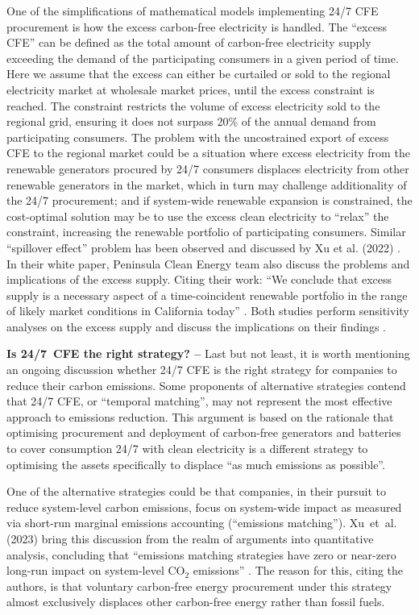 One of the simplifications of mathematical models implementing 24/7 CFE procurement is how the excess carbon-free electricity is handled. 
The \enquote{excess CFE} can be defined as the total amount of carbon-free electricity supply exceeding the demand of the participating consumers in a given period of time.
Here we assume that the excess can either be curtailed or sold to the regional electricity market at wholesale market prices, until the excess constraint is reached. 
The constraint restricts the volume of excess electricity sold to the regional grid, ensuring it does not surpass 20\% of the annual demand from participating consumers.
The problem with the uncostrained export of excess CFE to the regional market could be a situation where excess electricity from the renewable generators procured by 24/7 consumers displaces electricity from other renewable generators in the market, which in turn may challenge additionality of the 24/7 procurement; and if system-wide renewable expansion is constrained, the cost-optimal solution may be to use the excess clean electricity to \enquote{relax} the constraint, increasing the renewable portfolio of participating consumers.
Similar \enquote{spillover effect} problem has been observed and discussed by Xu et al. (2022) \cite{xu-247CFE-SSRN}.
In their white paper, Peninsula Clean Energy team also discuss the problems and implications of the excess supply. Citing their work: \enquote{We conclude that excess supply is a necessary aspect of a time-coincident renewable portfolio in the range of likely market conditions in California today} \cite{peninsula-report247}.
Both studies perform sensitivity analyses on the excess supply and discuss the implications on their findings \cite{xu-247CFE-SSRN, peninsula-report247}.

\textbf{Is 24/7~CFE the right strategy? --} Last but not least, it is worth mentioning an ongoing discussion whether 24/7 CFE is the right strategy for companies to reduce their carbon emissions.
Some proponents of alternative strategies contend that 24/7 CFE, or \enquote{temporal matching}, may not represent the most effective approach to emissions reduction. 
This argument is based on the rationale that optimising procurement and deployment of carbon-free generators and batteries to cover consumption 24/7 with clean electricity is a different strategy to optimising the assets specifically to displace \enquote{as much emissions as possible}.

One of the alternative strategies could be that companies, in their pursuit to reduce system-level carbon emissions, focus on system-wide impact as measured via short-run marginal emissions accounting (\enquote{emissions matching}).
Xu~et~al. (2023) bring this discussion from the realm of arguments into quantitative analysis, concluding that \enquote{emissions matching strategies have zero or near-zero long-run impact on system-level CO$_2$ emissions} \cite{princeton-247CFEvsEmissionality}. The reason for this, citing the authors, is that voluntary carbon-free energy procurement under this strategy almost exclusively displaces other carbon-free energy rather than fossil fuels.

